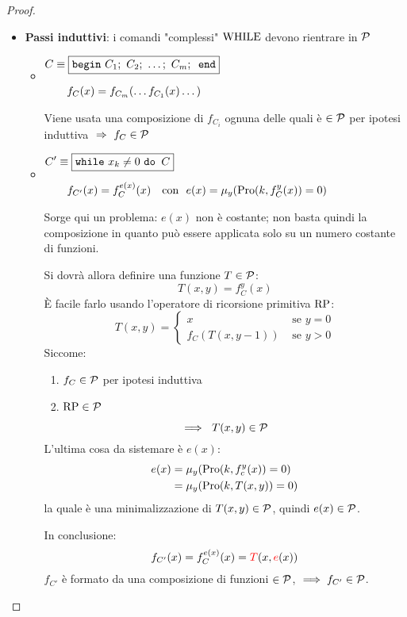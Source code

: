 \begin{proof}
\begin{itemize}
		\newpage

		\item \textbf{Passi induttivi}: i comandi "complessi" $\text{WHILE}$ devono rientrare in $\mathcal{P}$
		\begin{itemize}
			\renewcommand{\labelitemii}{\raisebox{2.1\height}{$-$}}
			\item $\begin{aligned}
				&C\equiv \boxed{
					\text{\texttt{begin} } C_ 1; \ C_2; \ \dots; \ C_m; \text{\texttt{ end}}
				}\\[.6em]
				&\hspace{2em}f_C(x) = f_{C_m}(\dots f_{C_1}(x)\dots)\\
			\end{aligned}$
			\vspace{.7em}
			
			Viene usata una composizione di $f_{C_i}$ ognuna delle quali è $\in\mathcal{P}$ per ipotesi induttiva $\ \Rightarrow \ f_{C} \in \mathcal{P} $
			
			\renewcommand{\labelitemii}{\raisebox{2.1\height}{$-$}}
			\item $\begin{aligned}
				&C'\equiv \boxed{\text{\texttt{while} } x_k \neq 0 \text{ \texttt{do }} C}\\[.6em]
				&\hspace{2em}f_{C'}(x) = f_C^{e(x)}(x)
				\ \ \text{ con } \ e(x)=\mu_y(\text{Pro}(k,f_C^y(x)) = 0)\\
			\end{aligned}$
			
			Sorge qui un problema: $e(x)$ non è costante; non basta quindi la composizione in quanto può essere applicata solo su un numero costante di funzioni.
			
			Si dovrà allora definire una funzione $T\in\mathcal{P}$:
			$$ T(x,y)=f_C^y(x) $$
			È facile farlo usando l'operatore di ricorsione primitiva $\text{RP}$:
			$$ T(x,y) = \begin{cases}
				x & \text{ se } y=0 \\
				f_C(T(x,y-1)) & \text{ se } y > 0
			\end{cases} $$
			Siccome:
			\begin{enumerate}
				\item $f_C \in \mathcal{P}$ per ipotesi induttiva
				\item $\text{RP} \in \mathcal{P}$
			\end{enumerate}
			$$ \implies \ T(x,y)\in \mathcal{P}$$
			L'ultima cosa da sistemare è $e(x)$:
			$$ \begin{aligned}
				e(x) & = \mu_y (\text{Pro}(k,f_c^y(x))=0) \\
				& =\mu_y(\text{Pro}(k,T(x,y)) = 0)
			\end{aligned} $$
			la quale è una minimalizzazione di $T(x,y) \in \mathcal{P}$, quindi $e(x)\in\mathcal{P}$.
			
			In conclusione:
			$$ f_{C'}(x) = f_C^{e(x)} (x) = {\color{red}T}(x,{\color{red}e}(x)) $$
			$f_{C'}$ è formato da una composizione di funzioni $\in\mathcal{P}$, $ \implies f_{C'} \in \mathcal{P}$. \\
		\end{itemize}
	\end{itemize}
\end{proof}
